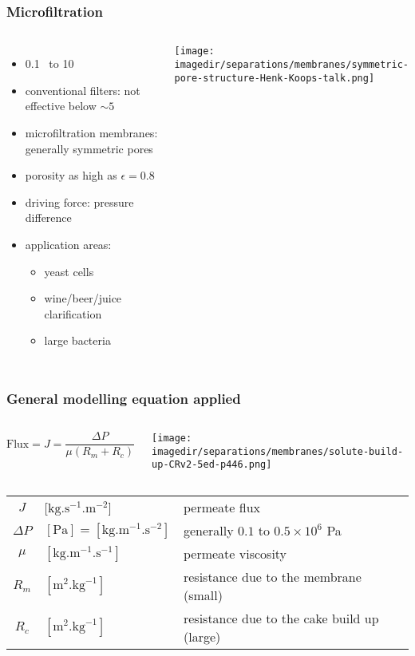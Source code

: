 \begin{frame}\frametitle{Microfiltration}
	\begin{columns}[t]
			\begin{itemize}
				\item	0.1 \micron ~to 10 \micron
				\item	conventional filters: not effective below $\sim 5$~\micron
				\item	microfiltration membranes: generally symmetric pores
				\item	porosity as high as $\epsilon = 0.8$
				\item	driving force: pressure difference
				\item	application areas:
					\begin{itemize}
						\item	yeast cells
						\item	wine/beer/juice clarification
						\item	large bacteria
					\end{itemize}
			\end{itemize}
			\begin{center}
				\texttt{[image: \\imagedir/separations/membranes/symmetric-pore-structure-Henk-Koops-talk.png]}
			\end{center}
	\end{columns}	
\end{frame}

\begin{frame}\frametitle{General modelling equation applied}
	\begin{exampleblock}{}
		\begin{columns}[c]
				\[
					\text{Flux} = J = \displaystyle \frac{\Delta P}{\mu \left(R_m + R_c \right)}
				\]
				\begin{center}
					\texttt{[image: \\imagedir/separations/membranes/solute-build-up-CRv2-5ed-p446.png]}
				\end{center}
		\end{columns}		
	\end{exampleblock}	
	\vspace{6pt}
	\begin{tabular}{cll}
		$J$			&	[$\text{kg}.\text{s}^{-1}\text{.m}^{-2}$] 				& permeate flux \\
		$\Delta P$	&	$[\text{Pa}] = [\text{kg}.\text{m}^{-1}\text{.s}^{-2}]$ & generally $0.1 \text{~to~} 0.5 \times 10^6$ Pa \\
		$\mu$ 		&  	$[\text{kg}.\text{m}^{-1}\text{.s}^{-1}]$				& permeate viscosity\\
		$R_m$ 		&  	$[\text{m}^2.\text{kg}^{-1}]$							& resistance due to the membrane (small)\\
		$R_c$ 		&  	$[\text{m}^2.\text{kg}^{-1}]$							& resistance due to the cake build up (large)\\
	\end{tabular}
\end{frame}

